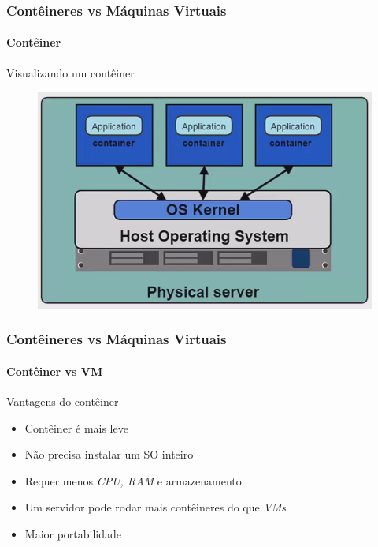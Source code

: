 \documentclass[12pt]{beamer}
\begin{document}
\begin{frame}
  \frametitle{Contêineres vs Máquinas Virtuais}
  \framesubtitle{Contêiner}
  \begin{block}{Visualizando um contêiner}
    \begin{figure}[!h]
      \centering
      \includegraphics[width=0.6\paperwidth]{container}
    \end{figure}
  \end{block}
\end{frame}
\begin{frame}
  \frametitle{Contêineres vs Máquinas Virtuais}
  \framesubtitle{Contêiner vs VM}
  \begin{block}{Vantagens do contêiner}
    \begin{itemize}
      \item Contêiner é mais leve
      \item Não precisa instalar um SO inteiro
      \item Requer menos \emph{CPU, RAM} e armazenamento 
      \item Um servidor pode rodar mais contêineres do que \emph{VMs}
      \item Maior portabilidade
    \end{itemize}
  \end{block}
\end{frame}
\end{document}
